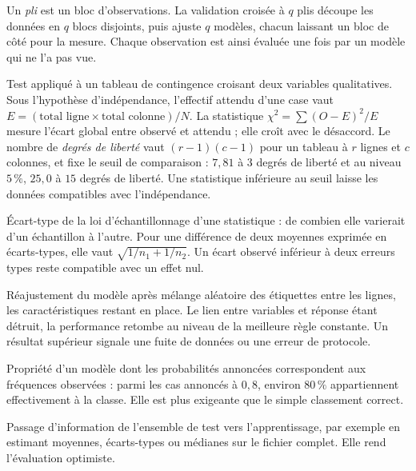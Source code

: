 \begin{description}[style=nextline,leftmargin=0pt]
  \item[\dsym{cv}{Validation croisée et pli}]
  Un \emph{pli} est un bloc d'observations. La validation croisée à $q$ plis
  découpe les données en $q$ blocs disjoints, puis ajuste $q$ modèles, chacun
  laissant un bloc de côté pour la mesure. Chaque observation est ainsi évaluée
  une fois par un modèle qui ne l'a pas vue.

  \item[\dsym{chi2}{Test du $\chi^2$ d'indépendance}]
  Test appliqué à un tableau de contingence croisant deux variables
  qualitatives. Sous l'hypothèse d'indépendance, l'effectif attendu d'une case
  vaut $E=(\text{total ligne}\times\text{total colonne})/N$. La statistique
  $\chi^2=\sum(O-E)^2/E$ mesure l'écart global entre observé et attendu ; elle
  croît avec le désaccord. Le nombre de \emph{degrés de liberté} vaut
  $(r-1)(c-1)$ pour un tableau à $r$ lignes et $c$ colonnes, et fixe le seuil de
  comparaison : $7{,}81$ à $3$ degrés de liberté et au niveau $5\,\%$, $25{,}0$ à
  $15$ degrés de liberté. Une statistique inférieure au seuil laisse les données
  compatibles avec l'indépendance.

  \item[\dsym{erreurtype}{Erreur type}]
  Écart-type de la loi d'échantillonnage d'une statistique : de combien elle
  varierait d'un échantillon à l'autre. Pour une différence de deux moyennes
  exprimée en écarts-types, elle vaut $\sqrt{1/n_1+1/n_2}$. Un écart observé
  inférieur à deux erreurs types reste compatible avec un effet nul.

  \item[\dsym{permutation}{Contrôle par permutation}]
  Réajustement du modèle après mélange aléatoire des étiquettes entre les lignes,
  les caractéristiques restant en place. Le lien entre variables et réponse étant
  détruit, la performance retombe au niveau de la meilleure règle constante. Un
  résultat supérieur signale une fuite de données ou une erreur de protocole.

  \item[\dsym{calibration}{Calibration}]
  Propriété d'un modèle dont les probabilités annoncées correspondent aux
  fréquences observées : parmi les cas annoncés à $0{,}8$, environ $80\,\%$
  appartiennent effectivement à la classe. Elle est plus exigeante que le simple
  classement correct.

  \item[\dsym{fuite}{Fuite de données}]
  Passage d'information de l'ensemble de test vers l'apprentissage, par exemple
  en estimant moyennes, écarts-types ou médianes sur le fichier complet. Elle rend
  l'évaluation optimiste.
\end{description}

